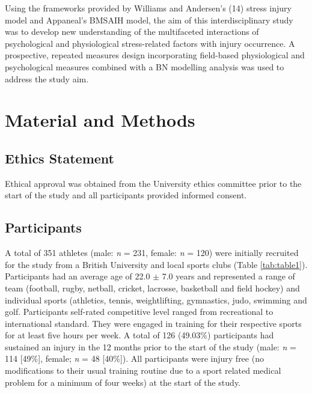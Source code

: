 \documentclass[
  english,
  man]{apa6}
\begin{document}
Using the frameworks provided by Williams and Andersen's (14) stress injury model and Appaneal's BMSAIH model, the aim of this interdisciplinary study was to develop new understanding of the multifaceted interactions of psychological and physiological stress-related factors with injury occurrence. A prospective, repeated measures design incorporating field-based physiological and psychological measures combined with a BN modelling analysis was used to address the study aim.

\hypertarget{material-and-methods}{%
\section{Material and Methods}\label{material-and-methods}}

\hypertarget{ethics-statement}{%
\subsection{Ethics Statement}\label{ethics-statement}}

Ethical approval was obtained from the University ethics committee prior to the start of the study and all participants provided informed consent.

\hypertarget{participants}{%
\subsection{Participants}\label{participants}}

A total of 351 athletes (male: \emph{n} = 231, female: \emph{n} = 120) were initially recruited for the study from a British University and local sports clubs (Table \ref{tab:table1}). Participants had an average age of 22.0 \(\pm\) 7.0 years and represented a range of team (football, rugby, netball, cricket, lacrosse, basketball and field hockey) and individual sports (athletics, tennis, weightlifting, gymnastics, judo, swimming and golf.
Participants self-rated competitive level ranged from recreational to international standard.
They were engaged in training for their respective sports for at least five hours per week.
A total of 126 (49.03\%) participants had sustained an injury in the 12 months prior to the start of the study (male: \emph{n} = 114 {[}49\%{]}, female; \emph{n} = 48 {[}40\%{]}).
All participants were injury free (no modifications to their usual training routine due to a sport related medical problem for a minimum of four weeks) at the start of the study.
\end{document}
